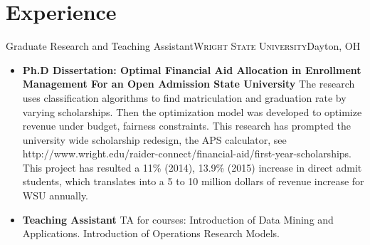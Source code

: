 \documentclass[12pt,letterpaper,roman]{moderncv} %
\begin{document}
\section{Experience}
 {Graduate Research and Teaching
Assistant}{\textsc{Wright State University}}{Dayton, OH}{}{
\begin{itemize}
\item \textbf{Ph.D Dissertation: Optimal Financial Aid Allocation in
Enrollment Management For an Open Admission State University}
\newline
The research uses classification algorithms to find
matriculation and graduation rate by varying scholarships. Then the
optimization model was developed to optimize revenue under budget, fairness constraints.
This research has prompted the university wide scholarship redesign, the APS
calculator, see http://www.wright.edu/raider-connect/financial-aid/first-year-scholarships.
This project has resulted a 11\% (2014), 13.9\% (2015) increase in direct admit
students, which translates into a 5 to 10 million dollars of revenue increase
for WSU annually.
\item \textbf{Teaching Assistant}
TA for courses: Introduction of Data Mining and Applications. Introduction of
Operations Research Models.
\end{itemize} }
\end{document}
